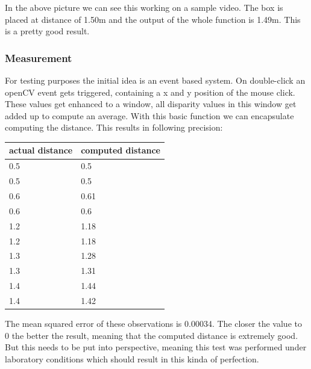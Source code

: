 \documentclass[journal,onecolumn]{IEEEtran}
\begin{document}
\noindent In the above picture we can see this working on a sample video. The box is placed at distance of 1.50m and the output of the whole function is 1.49m. This is a pretty good result.
\subsubsection{Measurement}
For testing purposes the initial idea is an event based system. On double-click an openCV event gets triggered, containing a x and y position of the mouse click. These values get enhanced to a window, all disparity values in this window get added up to compute an average. With this basic function we can encapsulate computing the distance. This results in following precision:
\begin{table}[H]
	\begin{tabular}{|l|l|}
		\hline
		actual distance & computed distance \\ \hline
		0.5             & 0.5               \\ \hline
		0.5             & 0.5               \\ \hline
		0.6             & 0.61              \\ \hline
		0.6             & 0.6               \\ \hline
		1.2             & 1.18              \\ \hline
		1.2             & 1.18              \\ \hline
		1.3             & 1.28              \\ \hline
		1.3             & 1.31              \\ \hline
		1.4             & 1.44              \\ \hline
		1.4             & 1.42              \\ \hline
	\end{tabular}
\end{table}
\noindent The mean squared error of these observations is 0.00034. The closer the value to 0 the better the result, meaning that the computed distance is extremely good. But this needs to be put into perspective, meaning this test was performed under laboratory conditions which should result in this kinda of perfection.
\end{document}
